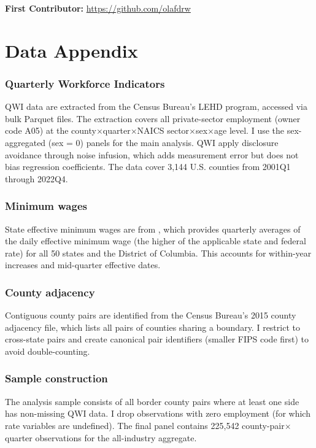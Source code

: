 \documentclass[12pt]{article}
\begin{document}
\noindent\textbf{First Contributor:} \url{https://github.com/olafdrw}

\label{apep_main_text_end}
\newpage


\newpage
\appendix

\section{Data Appendix}

\subsubsection*{Quarterly Workforce Indicators} QWI data are extracted from the Census Bureau's LEHD program, accessed via bulk Parquet files. The extraction covers all private-sector employment (owner code A05) at the county$\times$quarter$\times$NAICS sector$\times$sex$\times$age level. I use the sex-aggregated (sex = 0) panels for the main analysis. QWI apply disclosure avoidance through noise infusion, which adds measurement error but does not bias regression coefficients. The data cover 3,144 U.S. counties from 2001Q1 through 2022Q4.

\subsubsection*{Minimum wages} State effective minimum wages are from \citet{vaghul2021historical}, which provides quarterly averages of the daily effective minimum wage (the higher of the applicable state and federal rate) for all 50 states and the District of Columbia. This accounts for within-year increases and mid-quarter effective dates.

\subsubsection*{County adjacency} Contiguous county pairs are identified from the Census Bureau's 2015 county adjacency file, which lists all pairs of counties sharing a boundary. I restrict to cross-state pairs and create canonical pair identifiers (smaller FIPS code first) to avoid double-counting.

\subsubsection*{Sample construction} The analysis sample consists of all border county pairs where at least one side has non-missing QWI data. I drop observations with zero employment (for which rate variables are undefined). The final panel contains 225,542 county-pair$\times$quarter observations for the all-industry aggregate.
\end{document}
